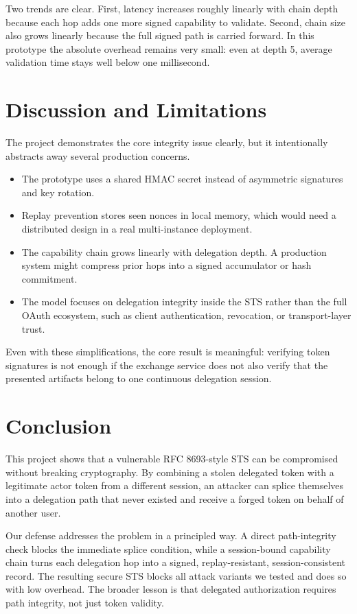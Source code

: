 \documentclass[11pt]{article}
\begin{document}
Two trends are clear. First, latency increases roughly linearly with chain depth because each hop adds one more signed capability to validate. Second, chain size also grows linearly because the full signed path is carried forward. In this prototype the absolute overhead remains very small: even at depth 5, average validation time stays well below one millisecond.

\section{Discussion and Limitations}
The project demonstrates the core integrity issue clearly, but it intentionally abstracts away several production concerns.

\begin{itemize}
  \item The prototype uses a shared HMAC secret instead of asymmetric signatures and key rotation.
  \item Replay prevention stores seen nonces in local memory, which would need a distributed design in a real multi-instance deployment.
  \item The capability chain grows linearly with delegation depth. A production system might compress prior hops into a signed accumulator or hash commitment.
  \item The model focuses on delegation integrity inside the STS rather than the full OAuth ecosystem, such as client authentication, revocation, or transport-layer trust.
\end{itemize}

Even with these simplifications, the core result is meaningful: verifying token signatures is not enough if the exchange service does not also verify that the presented artifacts belong to one continuous delegation session.

\section{Conclusion}
This project shows that a vulnerable RFC 8693-style STS can be compromised without breaking cryptography. By combining a stolen delegated token with a legitimate actor token from a different session, an attacker can splice themselves into a delegation path that never existed and receive a forged token on behalf of another user.

Our defense addresses the problem in a principled way. A direct path-integrity check blocks the immediate splice condition, while a session-bound capability chain turns each delegation hop into a signed, replay-resistant, session-consistent record. The resulting secure STS blocks all attack variants we tested and does so with low overhead. The broader lesson is that delegated authorization requires path integrity, not just token validity.
\end{document}

